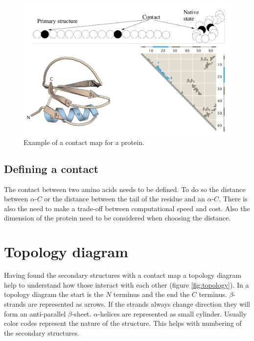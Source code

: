 \begin{figure}[H]
			\centering
			\includegraphics[width=\textwidth]{contact.png}
			\caption{Example of a contact map for a protein.}
			\label{fig:contact}
			\end{figure}


	\subsection{Defining a contact}
	The contact between two amino acids needs to be defined.
	To do so the distance between $\alpha$-$C$ or the distance between the tail of the residue and an $\alpha$-$C$.
	There is also the need to make a trade-off between computational speed and cost.
	Also the dimension of the protein need to be considered when choosing the distance.

\section{Topology diagram}
Having found the secondary structures with a contact map a topology diagram help to understand how those interact with each other (figure \ref{fig:topology}).
In a topology diagram the start is the $N$ terminus and the end the $C$ terminus.
$\beta$-strands are represented as arrows.
If the strands always change direction they will form an anti-parallel $\beta$-sheet.
$\alpha$-helices are represented as small cylinder.
Usually color codes represent the nature of the structure.
This helps with numbering of the secondary structures.

